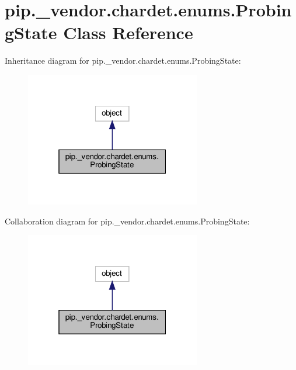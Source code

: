 \hypertarget{classpip_1_1__vendor_1_1chardet_1_1enums_1_1ProbingState}{}\section{pip.\+\_\+vendor.\+chardet.\+enums.\+Probing\+State Class Reference}
\label{classpip_1_1__vendor_1_1chardet_1_1enums_1_1ProbingState}


Inheritance diagram for pip.\+\_\+vendor.\+chardet.\+enums.\+Probing\+State\+:
\nopagebreak
\begin{figure}[H]
\begin{center}
\leavevmode
\includegraphics[width=217pt]{classpip_1_1__vendor_1_1chardet_1_1enums_1_1ProbingState__inherit__graph}
\end{center}
\end{figure}


Collaboration diagram for pip.\+\_\+vendor.\+chardet.\+enums.\+Probing\+State\+:
\nopagebreak
\begin{figure}[H]
\begin{center}
\leavevmode
\includegraphics[width=217pt]{classpip_1_1__vendor_1_1chardet_1_1enums_1_1ProbingState__coll__graph}
\end{center}
\end{figure}
